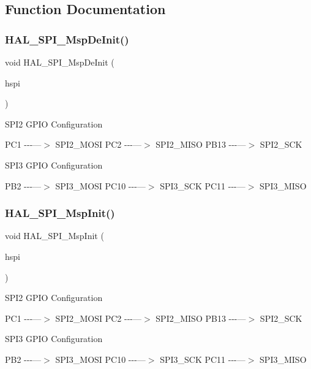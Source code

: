 \subsection{Function Documentation}
\mbox{\label{group___s_p_i___exported___functions___group1_gabadc4d4974af1afd943e8d13589068e1}} 
\subsubsection{\texorpdfstring{HAL\_SPI\_MspDeInit()}{HAL\_SPI\_MspDeInit()}}
{\footnotesize\ttfamily void H\+A\+L\+\_\+\+S\+P\+I\+\_\+\+Msp\+De\+Init (\begin{DoxyParamCaption}\item[{\mbox{\hyperlink{group___s_p_i___exported___types_gab3bd115785297692c125528b7293566b}{S\+P\+I\+\_\+\+Handle\+Type\+Def}} $\ast$}]{hspi }\end{DoxyParamCaption})}

S\+P\+I2 G\+P\+IO Configuration

P\+C1 -\/-\/-\/---$>$ S\+P\+I2\+\_\+\+M\+O\+SI P\+C2 -\/-\/-\/---$>$ S\+P\+I2\+\_\+\+M\+I\+SO P\+B13 -\/-\/-\/---$>$ S\+P\+I2\+\_\+\+S\+CK

S\+P\+I3 G\+P\+IO Configuration

P\+B2 -\/-\/-\/---$>$ S\+P\+I3\+\_\+\+M\+O\+SI P\+C10 -\/-\/-\/---$>$ S\+P\+I3\+\_\+\+S\+CK P\+C11 -\/-\/-\/---$>$ S\+P\+I3\+\_\+\+M\+I\+SO\mbox{\label{group___s_p_i___exported___functions___group1_ga17f583be14b22caffa6c4e56dcd035ef}} 
\subsubsection{\texorpdfstring{HAL\_SPI\_MspInit()}{HAL\_SPI\_MspInit()}}
{\footnotesize\ttfamily void H\+A\+L\+\_\+\+S\+P\+I\+\_\+\+Msp\+Init (\begin{DoxyParamCaption}\item[{\mbox{\hyperlink{group___s_p_i___exported___types_gab3bd115785297692c125528b7293566b}{S\+P\+I\+\_\+\+Handle\+Type\+Def}} $\ast$}]{hspi }\end{DoxyParamCaption})}

S\+P\+I2 G\+P\+IO Configuration

P\+C1 -\/-\/-\/---$>$ S\+P\+I2\+\_\+\+M\+O\+SI P\+C2 -\/-\/-\/---$>$ S\+P\+I2\+\_\+\+M\+I\+SO P\+B13 -\/-\/-\/---$>$ S\+P\+I2\+\_\+\+S\+CK

S\+P\+I3 G\+P\+IO Configuration

P\+B2 -\/-\/-\/---$>$ S\+P\+I3\+\_\+\+M\+O\+SI P\+C10 -\/-\/-\/---$>$ S\+P\+I3\+\_\+\+S\+CK P\+C11 -\/-\/-\/---$>$ S\+P\+I3\+\_\+\+M\+I\+SO